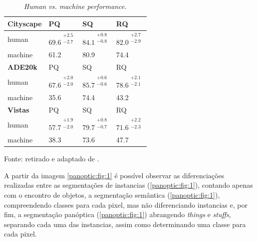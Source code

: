 \begin{table}[!h]
    \centering
    \caption{\textit{Human vs. machine performance.}}
    \label{panoptic:table:1}
    \begin{tabular}{@{}l|lll@{}}
    \textbf{Cityscape} & PQ   & SQ   & RQ   \\ \hline
    human              & $69.6^{\substack{+2.5\\-2.7}}$ & $84.1^{\substack{+0.8\\-0.8}}$ &  $82.0^{\substack{+2.7\\-2.9}}$ \\
    machine            & 61.2 & 80.9 & 74.4 \vspace*{0.3cm}\\
    \textbf{ADE20k}    & PQ   & SQ   & RQ   \\ \hline
    human              & $67.6^{\substack{+2.0\\-2.0}}$ & $85.7^{\substack{+0.6\\-0.6}}$ & $78.6^{\substack{+2.1\\-2.1}}$ \\
    machine            & 35.6 & 74.4 & 43.2 \vspace*{0.3cm}\\
    \textbf{Vistas}    & PQ   & SQ   & RQ   \\ \hline
    human              & $57.7^{\substack{+1.9\\-2.0}}$ & $79.7^{\substack{+0.8\\-0.7}}$ & $71.6^{\substack{+2.2\\-2.3}}$ \\
    machine            & 38.3 & 73.6 & 47.7
    \end{tabular}

    \vspace*{1 cm}
    Fonte: retirado e adaptado de \cite{Kirillov2019a}.
\end{table}

A partir da imagem \ref{panoptic:fig:1} é possível observar as diferenciações realizadas entre as segmentações de instancias (\ref{panoptic:fig:1}), contando apenas com o encontro de objetos, a segmentação semântica (\ref{panoptic:fig:1}), compreendendo classes para cada pixel, mas não diferenciando instancias e, por fim, a segmentação panóptica (\ref{panoptic:fig:1}) abrangendo \textit{things} e \textit{stuffs}, separando cada uma das instancias, assim como determinando uma classe para cada pixel.

